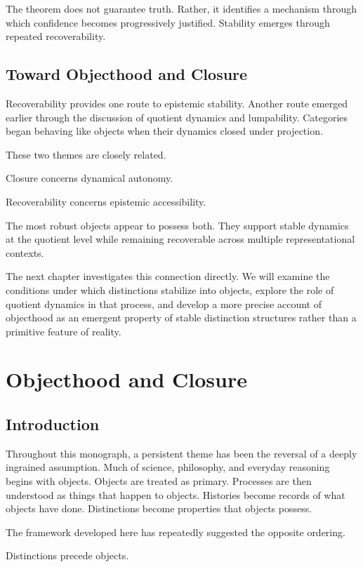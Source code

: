 \documentclass[11pt,oneside,openany]{book}
\begin{document}
The theorem does not guarantee truth. Rather, it identifies a mechanism through which confidence becomes progressively justified. Stability emerges through repeated recoverability.

\section{Toward Objecthood and Closure}

Recoverability provides one route to epistemic stability. Another route emerged earlier through the discussion of quotient dynamics and lumpability. Categories began behaving like objects when their dynamics closed under projection.

These two themes are closely related.

Closure concerns dynamical autonomy.

Recoverability concerns epistemic accessibility.

The most robust objects appear to possess both. They support stable dynamics at the quotient level while remaining recoverable across multiple representational contexts.

The next chapter investigates this connection directly. We will examine the conditions under which distinctions stabilize into objects, explore the role of quotient dynamics in that process, and develop a more precise account of objecthood as an emergent property of stable distinction structures rather than a primitive feature of reality.

\chapter{Objecthood and Closure}

\section{Introduction}

Throughout this monograph, a persistent theme has been the reversal of a deeply ingrained assumption. Much of science, philosophy, and everyday reasoning begins with objects. Objects are treated as primary. Processes are then understood as things that happen to objects. Histories become records of what objects have done. Distinctions become properties that objects possess.

The framework developed here has repeatedly suggested the opposite ordering.

Distinctions precede objects.
\end{document}
